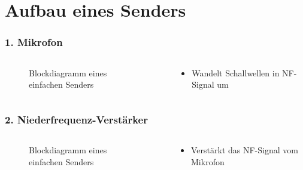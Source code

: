 
\section{Aufbau eines Senders}
\label{section:aufbau_sender}
\begin{frame}%

\frametitle{1. Mikrofon}
\begin{columns}
    \begin{column}{0.48\textwidth}
    
\begin{figure}
    \caption{\scriptsize Blockdiagramm eines einfachen Senders}
    \label{aufbau_sender}
\end{figure}


    \end{column}
   \begin{column}{0.48\textwidth}
       \begin{itemize}
  \item Wandelt Schallwellen in NF-Signal um
  \end{itemize}

   \end{column}
\end{columns}

\end{frame}

\begin{frame}
\frametitle{2. Niederfrequenz-Verstärker}
\begin{columns}
    \begin{column}{0.48\textwidth}
    
\begin{figure}
    \caption{\scriptsize Blockdiagramm eines einfachen Senders}
    \label{aufbau_sender}
\end{figure}


    \end{column}
   \begin{column}{0.48\textwidth}
       \begin{itemize}
  \item Verstärkt das NF-Signal vom Mikrofon
  \end{itemize}

   \end{column}
\end{columns}

\end{frame}

